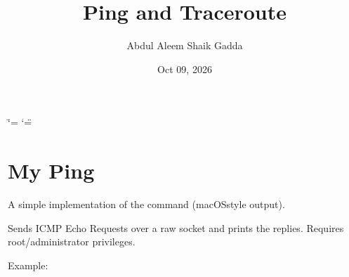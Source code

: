 \documentclass[a4paper,11pt,english,openany,oneside]{sphinxmanual}
\title{Ping and Traceroute}
\date{Oct 09, 2026}
\author{Abdul Aleem Shaik Gadda}
\begin{document}
\ifdefined\shorthandoff
  \ifnum\catcode`\=\string=\active\shorthandoff{=}\fi
  \ifnum\catcode`\"=\active{}\fi
\fi

\pagestyle{empty}
\sphinxmaketitle
\pagestyle{plain}
\sphinxtableofcontents
\pagestyle{normal}
\label{\detokenize{index::doc}}


\sphinxstepscope


\chapter{My Ping}
\label{\detokenize{ping:module-my_ping}}\label{\detokenize{ping:my-ping}}\label{\detokenize{ping::doc}}
\sphinxAtStartPar
A simple implementation of the  command (macOS\sphinxhyphen{}style output).

\sphinxAtStartPar
Sends ICMP Echo Requests over a raw socket and prints the replies.
Requires root/administrator privileges.

\sphinxAtStartPar
Example:

\begin{sphinxVerbatim}[commandchars=\\\{\}]
     
\end{sphinxVerbatim}
\end{document}
